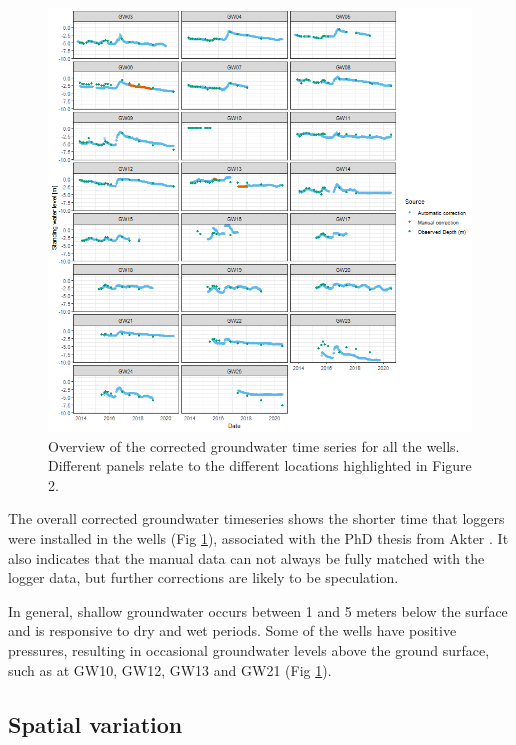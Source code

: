 \documentclass[, manuscript]{copernicus}
\begin{document}
\begin{figure}
\includegraphics[width=1\linewidth]{Figures/Final_Corrected_piezodepths} \caption{Overview of the corrected groundwater time series for all the wells. Different panels relate to the different locations highlighted in Figure 2.}\label{fig:gw-series}
\end{figure}

The overall corrected groundwater timeseries shows the shorter time that
loggers were installed in the wells (Fig \ref{fig:gw-series}),
associated with the PhD thesis from Akter \citeyearpar{Akter2018}. It
also indicates that the manual data can not always be fully matched with
the logger data, but further corrections are likely to be speculation.

In general, shallow groundwater occurs between 1 and 5 meters below the
surface and is responsive to dry and wet periods. Some of the wells have
positive pressures, resulting in occasional groundwater levels above the
ground surface, such as at GW10, GW12, GW13 and GW21 (Fig
\ref{fig:gw-series}).

\subsection{Spatial variation}
\end{document}
